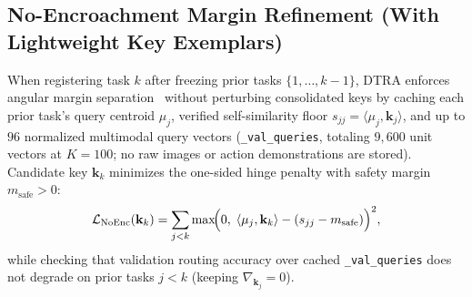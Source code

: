 \documentclass[10pt]{article}
\begin{document}
\subsection{No-Encroachment Margin Refinement (With Lightweight Key Exemplars)}
When registering task $k$ after freezing prior tasks $\{1,\dots,k-1\}$, DTRA enforces angular margin separation~\cite{deng2019arcface} without perturbing consolidated keys by caching each prior task's query centroid $\mu_j$, verified self-similarity floor $s_{jj} = \langle \mu_j, \mathbf{k}_j \rangle$, and up to $96$ normalized multimodal query vectors (\texttt{\_val\_queries}, totaling $9{,}600$ unit vectors at $K=100$; no raw images or action demonstrations are stored). Candidate key $\mathbf{k}_k$ minimizes the one-sided hinge penalty with safety margin $m_{\text{safe}} > 0$:
\begin{equation}
  \mathcal{L}_{\text{NoEnc}}(\mathbf{k}_k) = \sum_{j < k} \max\!\Bigl(0,\; \langle \mu_j, \mathbf{k}_k \rangle - (s_{jj} - m_{\text{safe}})\Bigr)^2,
\end{equation}
while checking that validation routing accuracy over cached \texttt{\_val\_queries} does not degrade on prior tasks $j < k$ (keeping $\nabla_{\mathbf{k}_j} = 0$).
\end{document}
